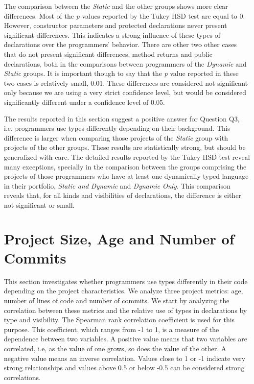 \documentclass[msc]{ppgccufmg}
\begin{document}
The comparison between the \emph{Static} and the other groups shows more clear differences.
Most of the \emph{p} values reported by the Tukey HSD test are equal to 0.
However, constructor parameters and protected declarations never present significant differences.
This indicates a strong influence of these types of declarations over the programmers' behavior.
There are other two other cases that do not present significant differences, method returns and public declarations, both in the comparisons between programmers of the \emph{Dynamic} and \emph{Static} groups.
It is important though to say that the \emph{p} value reported in these two cases is relatively small, 0.01.
These differences are considered not significant only because we are using a very strict confidence level, but would be considered significantly different under a confidence level of 0.05.

The results reported in this section suggest a positive answer for Question Q3, i.e, programmers use types differently depending on their background.
This difference is larger when comparing those projects of the \emph{Static} group with projects of the other groups.
These results are statistically strong,  but should be generalized with care.
The detailed results reported by the Tukey HSD test reveal many exceptions, specially in the comparison between the groups comprising the projects of those programmers who have at least one dynamically typed language in their portfolio, \emph{Static and Dynamic} and \emph{Dynamic Only}.
This comparison reveals that, for all kinds and visibilities of declarations, the difference is either not significant or small.


\section{Project Size, Age and Number of Commits\label{sec:results-maturity}}
This section investigates whether programmers use types differently in their code depending on the project characteristics.
We analyze three project metrics: age, number of lines of code and number of commits.
We start by analyzing the correlation between these metrics and the relative use of types in declarations by type and visibility.
The Spearman rank correlation coefficient is used for this purpose.
This coefficient, which ranges from -1 to 1, is a measure of the dependence between two variables.
A positive value means that two variables are correlated, i.e, as the value of one grows, so does the value of the other.
A negative value means an inverse correlation.
Values close to 1 or -1 indicate very strong relationships and values above 0.5 or below -0.5 can be considered strong correlations.
\end{document}
